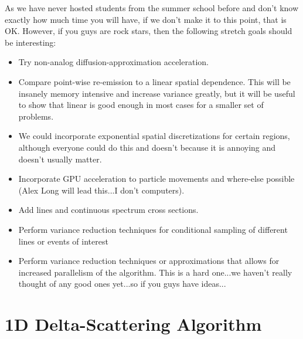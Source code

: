 \documentclass{article}
\begin{document}
As we have never hosted students from the summer school before and don't know
exactly how much time you will have, if we don't make
it to this point, that is OK.  However, if you guys are rock stars, then the
following stretch goals should be interesting:

\begin{itemize}

\item Try non-analog diffusion-approximation acceleration.
\item Compare point-wise re-emission to a linear spatial dependence.  This will
be insanely memory intensive and increase variance greatly, but it will be useful to show that linear is
good enough in most cases for a smaller set of problems.  
\item We could incorporate exponential spatial discretizations for certain
regions, although everyone could do this and doesn't because it is annoying and
doesn't usually matter.
\item Incorporate GPU acceleration to particle movements and where-else possible
(Alex Long will lead this...I don't computers).
\item Add lines and continuous spectrum cross sections.
\item Perform variance reduction techniques for conditional sampling of
different lines or events of interest
\item Perform variance reduction techniques or approximations that allows for increased
parallelism of the algorithm.  This is a hard one...we haven't really thought of
any good ones yet...so if you guys have ideas...

\end{itemize}

\section{1D Delta-Scattering Algorithm}
\end{document}
